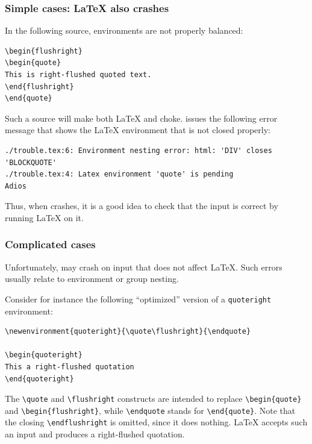 \subsubsection{Simple cases: \LaTeX{} also crashes}
In  the following source, environments are not properly balanced:
\begin{verbatim}
\begin{flushright}
\begin{quote}
This is right-flushed quoted text.
\end{flushright}
\end{quote}
\end{verbatim}
Such a source will make both \LaTeX{} and \hevea{} choke.
\hevea{} issues the following error message that shows the \LaTeX{}
environment that is not closed properly:
\begin{verbatim}
./trouble.tex:6: Environment nesting error: html: 'DIV' closes 'BLOCKQUOTE'
./trouble.tex:4: Latex environment 'quote' is pending
Adios
\end{verbatim}
Thus, when \hevea{} crashes, it is a good idea to check that the
input is correct by running \LaTeX{} on it.

\subsubsection{Complicated cases}

Unfortunately, \hevea{} may crash on input that does not affect
\LaTeX.
Such errors usually relate to environment or group nesting.

Consider for instance the following ``optimized'' version of a
\verb+quoteright+  environment:
\begin{verbatim}
\newenvironment{quoteright}{\quote\flushright}{\endquote}

\begin{quoteright}
This a right-flushed quotation
\end{quoteright}
\end{verbatim}

The \verb+\quote+ and \verb+\flushright+ constructs
are intended to replace
\verb+\begin{quote}+ and \verb+\begin{flushright}+,
while \verb+\endquote+ stands for \verb+\end{quote}+.
Note that the closing \verb+\endflushright+
is omitted, since it does nothing.
\LaTeX{} accepts such an input and produces a  right-flushed quotation.

